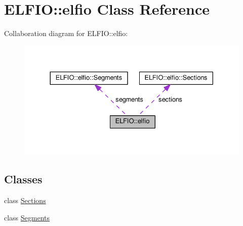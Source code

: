 \hypertarget{class_e_l_f_i_o_1_1elfio}{}\section{E\+L\+F\+IO\+:\+:elfio Class Reference}
\label{class_e_l_f_i_o_1_1elfio}


Collaboration diagram for E\+L\+F\+IO\+:\+:elfio\+:\nopagebreak
\begin{figure}[H]
\begin{center}
\leavevmode
\includegraphics[width=330pt]{class_e_l_f_i_o_1_1elfio__coll__graph}
\end{center}
\end{figure}
\subsection*{Classes}
\begin{DoxyCompactItemize}
\item 
class \hyperlink{class_e_l_f_i_o_1_1elfio_1_1_sections}{Sections}
\item 
class \hyperlink{class_e_l_f_i_o_1_1elfio_1_1_segments}{Segments}
\end{DoxyCompactItemize}
